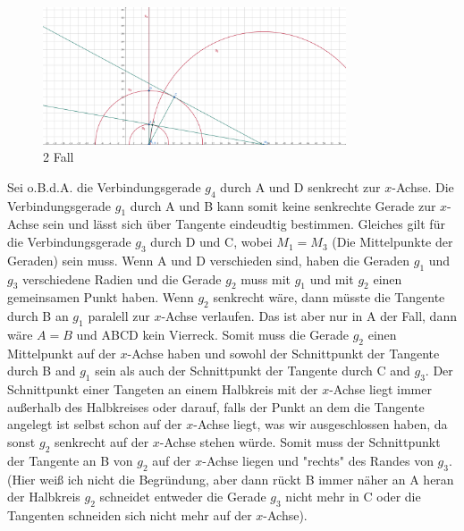 \documentclass[12pt,a4paper]{article}
\begin{document}
\begin{figure}[htbp]
    \centering
    \includegraphics[width=0.8\textwidth]{Blatt08_Aufgabe_22_ib.png}
    \caption{2 Fall}
    \label{fig:Aufgabe_22_ib}
\end{figure}

\noindent Sei o.B.d.A. die Verbindungsgerade $g_4$ durch A und D senkrecht zur $x$-Achse. Die Verbindungsgerade $g_1$ durch A und B kann somit keine senkrechte Gerade zur $x$-Achse sein und lässt sich über Tangente eindeudtig bestimmen. Gleiches gilt für die Verbindungsgerade $g_3$ durch D und C, wobei $M_1 = M_3$ (Die Mittelpunkte der Geraden) sein muss. Wenn A und D verschieden sind, haben die Geraden $g_1$ und $g_3$ verschiedene Radien und die Gerade $g_2$ muss mit $g_1$ und mit $g_2$ einen gemeinsamen Punkt haben. Wenn $g_2$ senkrecht wäre, dann müsste die Tangente durch B an $g_1$ paralell zur $x$-Achse verlaufen. Das ist aber nur in A der Fall, dann wäre $A=B$ und ABCD kein Vierreck. Somit muss die Gerade $g_2$ einen Mittelpunkt auf der $x$-Achse haben und sowohl der Schnittpunkt der Tangente durch B and $g_1$ sein als auch der Schnittpunkt der Tangente durch C and $g_3$. Der Schnittpunkt einer Tangeten an einem Halbkreis mit der $x$-Achse liegt immer außerhalb des Halbkreises oder darauf, falls der Punkt an dem die Tangente angelegt ist selbst schon auf der $x$-Achse liegt, was wir ausgeschlossen haben, da sonst $g_2$ senkrecht auf der $x$-Achse stehen würde. Somit muss der Schnittpunkt der Tangente an B von $g_2$ auf der $x$-Achse liegen und "rechts" des Randes von $g_3$. (Hier weiß ich nicht die Begründung, aber dann rückt B immer näher an A heran der Halbkreis $g_2$ schneidet entweder die Gerade $g_3$ nicht mehr in C oder die Tangenten schneiden sich nicht mehr auf der $x$-Achse).

\newpage
\end{document}
